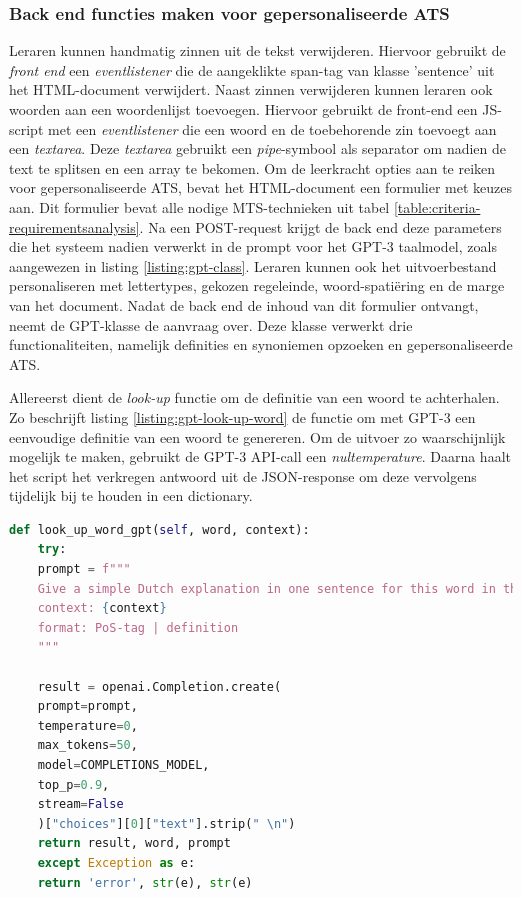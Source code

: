 \subsubsection{Back end functies maken voor gepersonaliseerde ATS}

Leraren kunnen handmatig zinnen uit de tekst verwijderen. Hiervoor gebruikt de \textit{front end} een \textit{eventlistener} die de aangeklikte span-tag van klasse 'sentence' uit het HTML-document verwijdert. Naast zinnen verwijderen kunnen leraren ook woorden aan een woordenlijst toevoegen. Hiervoor gebruikt de front-end een JS-script met een \textit{eventlistener} die een woord en de toebehorende zin toevoegt aan een \textit{textarea}. Deze \textit{textarea} gebruikt een \textit{pipe}-symbool als separator om nadien de text te splitsen en een array te bekomen. Om de leerkracht opties aan te reiken voor gepersonaliseerde ATS, bevat het HTML-document een formulier met keuzes aan. Dit formulier bevat alle nodige MTS-technieken uit tabel \ref{table:criteria-requirementsanalysis}. Na een POST-request krijgt de back end deze parameters die het systeem nadien verwerkt in de prompt voor het GPT-3 taalmodel, zoals aangewezen in listing \ref{listing:gpt-class}. Leraren kunnen ook het uitvoerbestand personaliseren met lettertypes, gekozen regeleinde, woord-spatiëring en de marge van het document. Nadat de back end de inhoud van dit formulier ontvangt, neemt de GPT-klasse de aanvraag over. Deze klasse verwerkt drie functionaliteiten, namelijk definities en synoniemen opzoeken en gepersonaliseerde ATS.

\medspace

Allereerst dient de \textit{look-up} functie om de definitie van een woord te achterhalen. Zo beschrijft listing \ref{listing:gpt-look-up-word} de functie om met GPT-3 een eenvoudige definitie van een woord te genereren. Om de uitvoer zo waarschijnlijk mogelijk te maken, gebruikt de GPT-3 API-call een \textit{nultemperature}. Daarna haalt het script het verkregen antwoord uit de JSON-response om deze vervolgens tijdelijk bij te houden in een dictionary.

\begin{lstlisting}[language=Python, caption={Een functie om met GPT-3 een vereenvoudigde definitie voor een woord te genereren.}, label={listing:gpt-look-up-word}]
def look_up_word_gpt(self, word, context):
	try:
	prompt = f"""
	Give a simple Dutch explanation in one sentence for this word in the given context. Give the PoS-tag and Dutch definition: '{word}'
	context: {context}
	format: PoS-tag | definition
	"""

	result = openai.Completion.create(
	prompt=prompt,
	temperature=0,
	max_tokens=50,
	model=COMPLETIONS_MODEL,
	top_p=0.9,
	stream=False
	)["choices"][0]["text"].strip(" \n")    
	return result, word, prompt	
	except Exception as e:
	return 'error', str(e), str(e)
\end{lstlisting}

